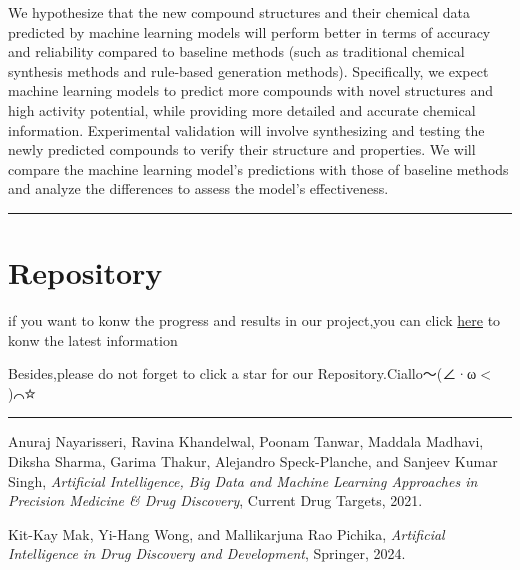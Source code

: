 \documentclass{ctexart}
\begin{document}
We hypothesize that the new compound structures and their chemical data predicted by machine learning models will perform better in terms of accuracy and reliability compared to baseline methods (such as traditional chemical synthesis methods and rule-based generation methods). Specifically, we expect machine learning models to predict more compounds with novel structures and high activity potential, while providing more detailed and accurate chemical information. Experimental validation will involve synthesizing and testing the newly predicted compounds to verify their structure and properties. We will compare the machine learning model’s predictions with those of baseline methods and analyze the differences to assess the model's effectiveness.


\vspace{1em}
\hrule
\section{Repository}
if you want to konw the progress and results in our project,you can click \href{https://github.com/Fully-ripe-mango/DeepLearningGroup/tree/main}{here} to konw the latest information

Besides,please do not forget to click a star for our Repository.Ciallo～(∠·ω$<$)⌒☆

\hrule
\begin{thebibliography}{9}

    Anuraj Nayarisseri, Ravina Khandelwal, Poonam Tanwar, Maddala Madhavi, Diksha Sharma, Garima Thakur, Alejandro Speck-Planche, and Sanjeev Kumar Singh,
    \textit{Artificial Intelligence, Big Data and Machine Learning Approaches in Precision Medicine \& Drug Discovery}, 
    Current Drug Targets, 2021.
    
    Kit-Kay Mak, Yi-Hang Wong, and Mallikarjuna Rao Pichika,
    \textit{Artificial Intelligence in Drug Discovery and Development}, 
    Springer, 2024.

\end{thebibliography}
\end{document}
